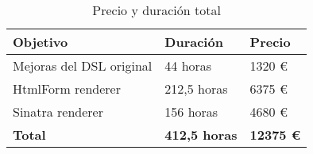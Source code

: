 \begin{table}[!ht]
\begin{center}
\begin{tabular}{|p{80mm}|p{25mm}|p{20mm}|} \hline 
\textbf{Objetivo} & \textbf{Duraci\'on} & \textbf{Precio} \\ \hline

Mejoras del DSL original &
44 horas &
1320 \euro{}
\\
\hline

HtmlForm renderer &
212,5 horas &
6375 \euro{}
\\
\hline

Sinatra renderer &
156 horas &
4680 \euro{}
\\
\hline \hline

{\bfseries Total} &
{\bfseries 412,5 horas} &
{\bfseries 12375 \euro{}}
\\
\hline

\end{tabular}
\end{center}
\caption{Precio y duraci\'on total}
\label{table:resOthers4}
\end{table}
